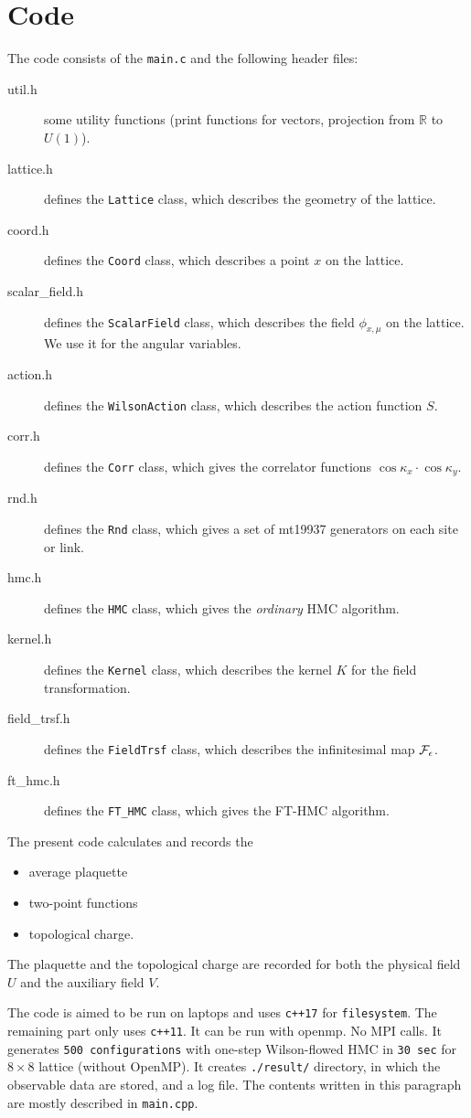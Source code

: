\documentclass[12pt]{article}
\begin{document}
\section{Code}
\label{sec:code}

The code consists of the {\tt main.c} and the following
header files:
\begin{description}
\item[util.h] some utility functions (print functions for vectors, projection from $\mathbb{R}$ to $U(1)$).
\item[lattice.h] defines the {\tt Lattice} class, which describes the geometry of the lattice.
\item[coord.h] defines the {\tt Coord} class, which describes a point $x$ on the lattice.
\item[scalar\_field.h] defines the {\tt ScalarField} class, which describes the field $\phi_{x,\mu}$ on the lattice. We use it for the angular variables.
\item[action.h] defines the {\tt WilsonAction} class, which describes the action function $S$.
\item[corr.h] defines the {\tt Corr} class, which gives the correlator functions $\cos\kappa_x\cdot\cos\kappa_y$.
\item[rnd.h] defines the {\tt Rnd} class, which gives a set of mt19937 generators on each site or link.
\item[hmc.h] defines the {\tt HMC} class, which gives the {\it ordinary} HMC algorithm.
\item[kernel.h] defines the {\tt Kernel} class, which describes the kernel $K$ for the field transformation.
\item[field\_trsf.h] defines the {\tt FieldTrsf} class, which describes the infinitesimal map $\cal{F}_\epsilon$.
\item[ft\_hmc.h] defines the {\tt FT\_HMC} class, which gives the FT-HMC algorithm.
\end{description}

The present code calculates and records the
\begin{itemize}
\item average plaquette
\item two-point functions
\item topological charge.
\end{itemize}
The plaquette and the topological charge are recorded for both the physical field $U$ and the auxiliary field $V$.

The code is aimed to be run on laptops and uses {\tt c++17} for {\tt filesystem}.
The remaining part only uses {\tt c++11}.
It can be run with openmp. No MPI calls.
It generates {\tt 500 configurations} with one-step Wilson-flowed HMC in {\tt 30 sec} for $8\times 8$ lattice (without OpenMP).
It creates {\tt ./result/} directory, in which the observable data are stored, and a log file.
The contents written in this paragraph are mostly described in {\tt main.cpp}.
\end{document}
